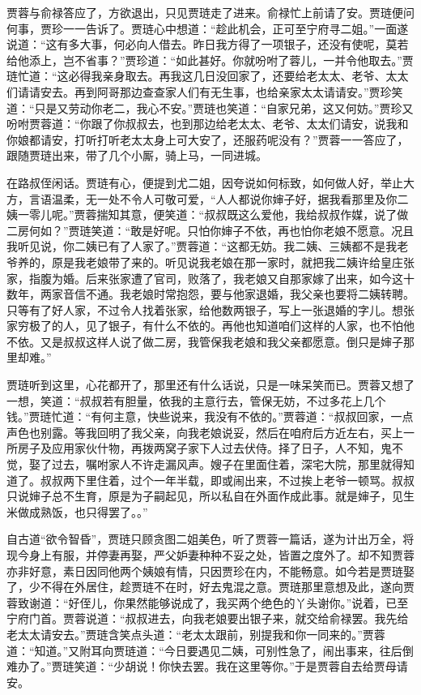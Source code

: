 贾蓉与俞禄答应了，方欲退出，只见贾琏走了进来。俞禄忙上前请了安。贾琏便问何事，贾珍一一告诉了。贾琏心中想道：``趁此机会，正可至宁府寻二姐。''一面遂说道：``这有多大事，何必向人借去。昨日我方得了一项银子，还没有使呢，莫若给他添上，岂不省事？''贾珍道：``如此甚好。你就吩咐了蓉儿，一并令他取去。''贾琏忙道：``这必得我亲身取去。再我这几日没回家了，还要给老太太、老爷、太太们请请安去。再到阿哥那边查查家人们有无生事，也给亲家太太请请安。''贾珍笑道：``只是又劳动你老二，我心不安。''贾琏也笑道：``自家兄弟，这又何妨。''贾珍又吩咐贾蓉道：``你跟了你叔叔去，也到那边给老太太、老爷、太太们请安，说我和你娘都请安，打听打听老太太身上可大安了，还服药呢没有？''贾蓉一一答应了，跟随贾琏出来，带了几个小厮，骑上马，一同进城。

在路叔侄闲话。贾琏有心，便提到尤二姐，因夸说如何标致，如何做人好，举止大方，言语温柔，无一处不令人可敬可爱，``人人都说你婶子好，据我看那里及你二姨一零儿呢。''贾蓉揣知其意，便笑道：``叔叔既这么爱他，我给叔叔作媒，说了做二房何如？''贾琏笑道：``敢是好呢。只怕你婶子不依，再也怕你老娘不愿意。况且我听见说，你二姨已有了人家了。''贾蓉道：``这都无妨。我二姨、三姨都不是我老爷养的，原是我老娘带了来的。听见说我老娘在那一家时，就把我二姨许给皇庄张家，指腹为婚。后来张家遭了官司，败落了，我老娘又自那家嫁了出来，如今这十数年，两家音信不通。我老娘时常抱怨，要与他家退婚，我父亲也要将二姨转聘。只等有了好人家，不过令人找着张家，给他数两银子，写上一张退婚的字儿。想张家穷极了的人，见了银子，有什么不依的。再他也知道咱们这样的人家，也不怕他不依。又是叔叔这样人说了做二房，我管保我老娘和我父亲都愿意。倒只是婶子那里却难。''

贾琏听到这里，心花都开了，那里还有什么话说，只是一味呆笑而已。贾蓉又想了一想，笑道：``叔叔若有胆量，依我的主意行去，管保无妨，不过多花上几个钱。''贾琏忙道：``有何主意，快些说来，我没有不依的。''贾蓉道：``叔叔回家，一点声色也别露。等我回明了我父亲，向我老娘说妥，然后在咱府后方近左右，买上一所房子及应用家伙什物，再拨两窝子家下人过去伏侍。择了日子，人不知，鬼不觉，娶了过去，嘱咐家人不许走漏风声。嫂子在里面住着，深宅大院，那里就得知道了。叔叔两下里住着，过个一年半载，即或闹出来，不过挨上老爷一顿骂。叔叔只说婶子总不生育，原是为子嗣起见，所以私自在外面作成此事。就是婶子，见生米做成熟饭，也只得罢了。。''

自古道``欲令智昏''，贾琏只顾贪图二姐美色，听了贾蓉一篇话，遂为计出万全，将现今身上有服，并停妻再娶，严父妒妻种种不妥之处，皆置之度外了。却不知贾蓉亦非好意，素日因同他两个姨娘有情，只因贾珍在内，不能畅意。如今若是贾琏娶了，少不得在外居住，趁贾琏不在时，好去鬼混之意。贾琏那里意想及此，遂向贾蓉致谢道：``好侄儿，你果然能够说成了，我买两个绝色的丫头谢你。''说着，已至宁府门首。贾蓉说道：``叔叔进去，向我老娘要出银子来，就交给俞禄罢。我先给老太太请安去。''贾琏含笑点头道：``老太太跟前，别提我和你一同来的。''贾蓉道：``知道。''又附耳向贾琏道：``今日要遇见二姨，可别性急了，闹出事来，往后倒难办了。''贾琏笑道：``少胡说！你快去罢。我在这里等你。''于是贾蓉自去给贾母请安。

